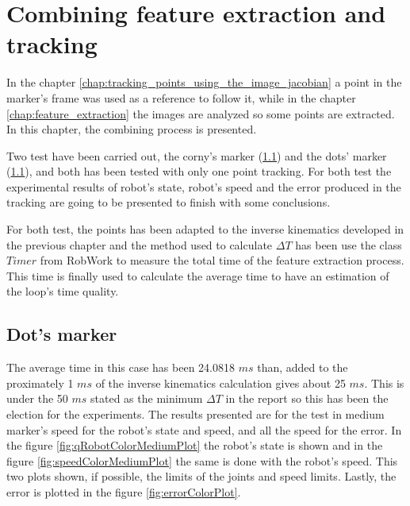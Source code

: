 









\chapter{Combining feature extraction and tracking} %
\label{chap:combining_feature_extraction_and_tracking}
	In the chapter \ref{chap:tracking_points_using_the_image_jacobian} a point in the marker's frame was used as a reference to follow it, while in the chapter \ref{chap:feature_extraction} the images are analyzed so some points are extracted. 
	In this chapter, the combining process is presented.

	Two test have been carried out, the corny's marker (\ref{sec:dot_s_marker}) and the dots' marker (\ref{sec:dot_s_marker}), and both has been tested with only one point tracking.
	For both test the experimental results of robot's state, robot's speed and the error produced in the tracking are going to be presented to finish with some conclusions.

	For both test, the points has been adapted to the inverse kinematics developed in the previous chapter and the method used to calculate $\Delta T$ has been use the class $Timer$ from RobWork to measure the total time of the feature extraction process. This time is finally used to calculate the average time to have an estimation of the loop's time quality.

	\section{Dot's marker} %
	\label{sec:dot_s_marker}
		The average time in this case has been 24.0818 $ms$ than, added to the proximately 1 $ms$ of the inverse kinematics calculation gives about 25 $ms$. 
		This is under the 50 $ms$ stated as the minimum $\Delta T$ in the report so this has been the election for the experiments. 
		The results presented are for the test in medium marker's speed for the robot's state and speed, and all the speed for the error. 
		In the figure \ref{fig:qRobotColorMediumPlot} the robot's state is shown and in the figure \ref{fig:speedColorMediumPlot} the same is done with the robot's speed. This two plots shown, if possible, the limits of the joints and speed limits. Lastly, the error is plotted in the figure \ref{fig:errorColorPlot}.
		

